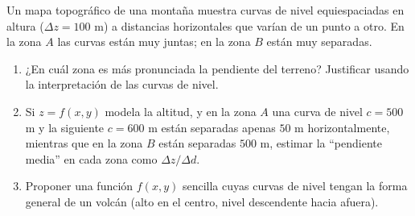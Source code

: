 Un mapa topográfico de una montaña muestra curvas de nivel equiespaciadas en altura ($\Delta z = 100$ m) a distancias horizontales que varían de un punto a otro. En la zona $A$ las curvas están muy juntas; en la zona $B$ están muy separadas.
\begin{enumerate}
    \item ¿En cuál zona es más pronunciada la pendiente del terreno? Justificar usando la interpretación de las curvas de nivel.
    \item Si $z = f(x,y)$ modela la altitud, y en la zona $A$ una curva de nivel $c=500$ m y la siguiente $c=600$ m están separadas apenas $50$ m horizontalmente, mientras que en la zona $B$ están separadas $500$ m, estimar la ``pendiente media'' en cada zona como $\Delta z / \Delta d$.
    \item Proponer una función $f(x,y)$ sencilla cuyas curvas de nivel tengan la forma general de un volcán (alto en el centro, nivel descendente hacia afuera).
\end{enumerate}
